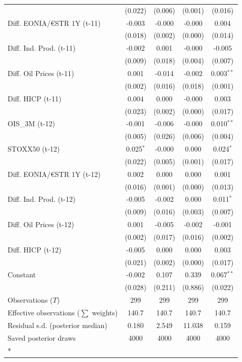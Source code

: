 \begin{longtable}[t]{lcccc}
 & (0.022) & (0.006) & (0.001) & (0.016)\\
Diff. EONIA/€STR 1Y (t-11) & -0.003 & -0.000 & -0.000 & 0.004\\
 & (0.018) & (0.002) & (0.000) & (0.014)\\
Diff. Ind. Prod. (t-11) & -0.002 & 0.001 & -0.000 & -0.005\\
 & (0.009) & (0.018) & (0.004) & (0.007)\\
Diff. Oil Prices (t-11) & 0.001 & -0.014 & -0.002 & 0.003$^{**}$\\
 & (0.002) & (0.016) & (0.018) & (0.001)\\
Diff. HICP (t-11) & 0.004 & 0.000 & -0.000 & 0.003\\
 & (0.023) & (0.002) & (0.000) & (0.017)\\
OIS\_3M (t-12) & -0.001 & -0.006 & -0.000 & 0.010$^{**}$\\
 & (0.005) & (0.026) & (0.006) & (0.004)\\
STOXX50 (t-12) & 0.025$^{*}$ & -0.000 & 0.000 & 0.024$^{*}$\\
 & (0.022) & (0.005) & (0.001) & (0.017)\\
Diff. EONIA/€STR 1Y (t-12) & 0.002 & 0.000 & 0.000 & 0.001\\
 & (0.016) & (0.001) & (0.000) & (0.013)\\
Diff. Ind. Prod. (t-12) & -0.005 & -0.002 & 0.000 & 0.011$^{*}$\\
 & (0.009) & (0.016) & (0.003) & (0.007)\\
Diff. Oil Prices (t-12) & 0.001 & -0.005 & -0.002 & -0.001\\
 & (0.002) & (0.017) & (0.016) & (0.002)\\
Diff. HICP (t-12) & -0.005 & 0.000 & 0.000 & 0.003\\
 & (0.021) & (0.002) & (0.000) & (0.017)\\
Constant & -0.002 & 0.107 & 0.339 & 0.067$^{**}$\\
 & (0.028) & (0.211) & (0.886) & (0.022)\\
\midrule
Observations ($T$) & 299 & 299 & 299 & 299\\
Effective observations ($\sum$ weights) & 140.7 & 140.7 & 140.7 & 140.7\\
Residual s.d. (posterior median) & 0.180 & 2.549 & 11.038 & 0.159\\
Saved posterior draws & 4000 & 4000 & 4000 & 4000\\*
\end{longtable}
\endgroup{}

